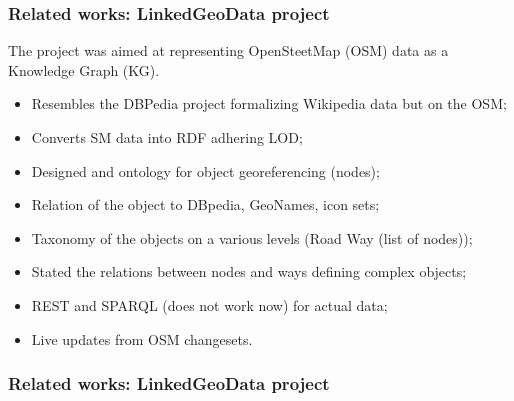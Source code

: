 \documentclass[10pt]{beamer}
\begin{document}

\begin{frame}
  \frametitle{Related works: LinkedGeoData project}
  The project \cite{lgd} was aimed at representing OpenSteetMap (OSM) data as a Knowledge Graph (KG).
  \begin{itemize}
  \item Resembles the DBPedia project formalizing Wikipedia data but on the OSM;
  \item Converts SM data into RDF adhering LOD;
  \item Designed and ontology for object georeferencing (nodes);
  \item Relation of the object to DBpedia, GeoNames, icon sets;
  \item Taxonomy of the objects on a various levels (Road \to Way (list of nodes)); %
  \item Stated the relations between nodes and ways defining complex objects;
  \item REST and SPARQL (does not work now) for actual data;
  \item Live updates from OSM changesets.
  \end{itemize}

\end{frame}


\begin{frame}
  \frametitle{Related works: LinkedGeoData project}
\end{frame}
\end{document}
